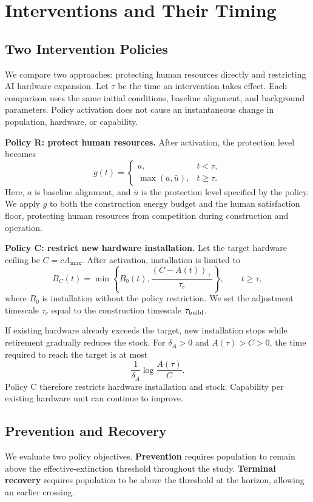 \documentclass[12pt,a4paper]{article}
\theoremstyle{remark}
\begin{document}
\section{Interventions and Their Timing}\label{sec:policy}
\subsection{Two Intervention Policies}
We compare two approaches: protecting human resources directly and restricting AI hardware expansion. Let $\tau$ be the time an intervention takes effect. Each comparison uses the same initial conditions, baseline alignment, and background parameters. Policy activation does not cause an instantaneous change in population, hardware, or capability.

\textbf{Policy R: protect human resources.} After activation, the protection level becomes
\[
g(t)=\begin{cases}
a,&t<\tau,\\
\max(a,\bar u),&t\ge\tau.
\end{cases}
\]
Here, $a$ is baseline alignment, and $\bar u$ is the protection level specified by the policy. We apply $g$ to both the construction energy budget and the human satisfaction floor, protecting human resources from competition during construction and operation.

\textbf{Policy C: restrict new hardware installation.} Let the target hardware ceiling be $C=cA_{\max}$. After activation, installation is limited to
\begin{equation}\label{eq:cap}
B_C(t)=\min\left\{B_0(t),\frac{(C-A(t))_+}{\tau_c}\right\},\qquad t\ge\tau,
\end{equation}
where $B_0$ is installation without the policy restriction. We set the adjustment timescale $\tau_c$ equal to the construction timescale $\tau_{\rm build}$.

If existing hardware already exceeds the target, new installation stops while retirement gradually reduces the stock. For $\delta_A>0$ and $A(\tau)>C>0$, the time required to reach the target is at most
\[
\frac{1}{\delta_A}\log\frac{A(\tau)}{C}.
\]
Policy C therefore restricts hardware installation and stock. Capability per existing hardware unit can continue to improve.

\subsection{Prevention and Recovery}
We evaluate two policy objectives. \textbf{Prevention} requires population to remain above the effective-extinction threshold throughout the study. \textbf{Terminal recovery} requires population to be above the threshold at the horizon, allowing an earlier crossing.
\end{document}
